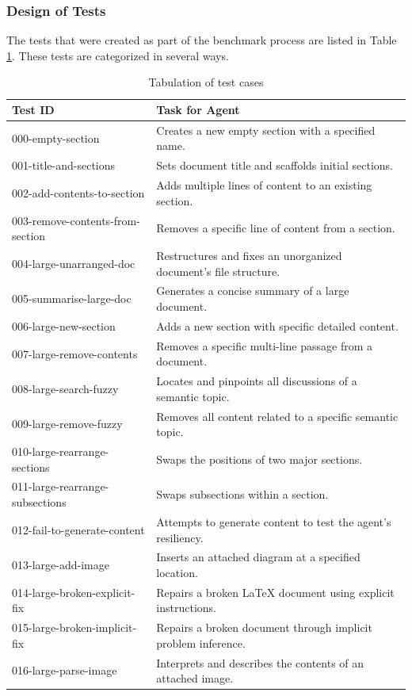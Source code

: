 \subsubsection{Design of Tests}

The tests that were created as part of the benchmark process are listed in Table \ref{tab:tests}.
These tests are categorized in several ways.

\begin{table}[htb]
\centering
\begin{tabularx}{\textwidth}{|l|X|}
\hline
\textbf{Test ID} & \textbf{Task for Agent} \\
\hline
000-empty-section & Creates a new empty section with a specified name. \\
\hline
001-title-and-sections & Sets document title and scaffolds initial sections. \\
\hline
002-add-contents-to-section & Adds multiple lines of content to an existing section. \\
\hline
003-remove-contents-from-section & Removes a specific line of content from a section. \\
\hline
004-large-unarranged-doc & Restructures and fixes an unorganized document's file structure. \\
\hline
005-summarise-large-doc & Generates a concise summary of a large document. \\
\hline
006-large-new-section & Adds a new section with specific detailed content. \\
\hline
007-large-remove-contents & Removes a specific multi-line passage from a document. \\
\hline
008-large-search-fuzzy & Locates and pinpoints all discussions of a semantic topic. \\
\hline
009-large-remove-fuzzy & Removes all content related to a specific semantic topic. \\
\hline
010-large-rearrange-sections & Swaps the positions of two major sections. \\
\hline
011-large-rearrange-subsections & Swaps subsections within a section. \\
\hline
012-fail-to-generate-content & Attempts to generate content to test the agent's resiliency. \\
\hline
013-large-add-image & Inserts an attached diagram at a specified location. \\
\hline
014-large-broken-explicit-fix & Repairs a broken LaTeX document using explicit instructions. \\
\hline
015-large-broken-implicit-fix & Repairs a broken document through implicit problem inference. \\
\hline
016-large-parse-image & Interprets and describes the contents of an attached image. \\
\hline
\end{tabularx}
\caption{Tabulation of test cases}
\label{tab:tests}
\end{table}


